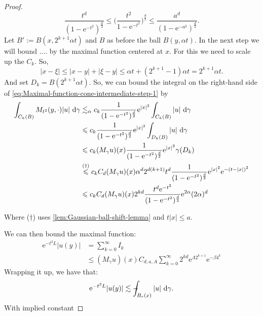 \documentclass[a4paper,oneside,10pt]{amsproc}
\theoremstyle{remark}
\newcommand{\D}{\,\textup{d}}
\def\Xint#1{\mathchoice
  {\XXint\displaystyle\textstyle{#1}}%
  {\XXint\textstyle\scriptstyle{#1}}%
  {\XXint\scriptstyle\scriptscriptstyle{#1}}%
  {\XXint\scriptscriptstyle\scriptscriptstyle{#1}}%
  \!\int}
\def\XXint#1#2#3{{\setbox0=\hbox{$#1{#2#3}{\int}$ }
    \vcenter{\hbox{$#2#3$ }}\kern-.535\wd0}}
\def\dashint{\Xint-}
\renewcommand{\leq}{\leqslant}
\renewcommand{\leq}{\leqslant}
\newcommand{\e}{\mathrm{e}} %
\renewcommand{\leq}{\leqslant}%
\begin{document}
\begin{proof}
  \begin{equation*}
    \frac{t^d}{(1 - \e^{-t^2})^{\frac{d}2}} \leq \biggl(\frac{t^2}{1 -
      \e^{-t^2}} \biggr)^{\frac{d}2} \leq \frac{a^d}{(1 -
      \e^{-a^2})^{\frac{d}2}}.
  \end{equation*}
  Let $B' := B(x, 2^{k + 1} \alpha t)$ and $B$ as before the ball $B(y,
  \alpha t)$. In the next step we will bound ....
  by the maximal function centered at $x$. For this we need to scale
  up the $C_k$. So,
  \begin{equation*}
    |x - \xi| \leq |x - y| + |\xi - y| \leq \alpha t + (2^{k + 1} - 1)
    \alpha t = 2^{k + 1} \alpha t.
  \end{equation*}
  And set $D_k = B(2^{k + 1} \alpha t)$.
  So, we can bound the integral on the right-hand side of
  \eqref{eq:Maximal-function-cone-intermediate-step-1} by
  \begin{align*}
    \int_{C_k(B)}  M_{t^2}(y, \cdot) |u| \,\D\gamma & \lesssim_\alpha
    c_k \frac1{(1 - \e^{-t^2})^{\frac{d}2}}  \e^{|x|^2} \int_{C_k(B)}
    |u| \,\D\gamma\\ 
    &\leq c_k \frac1{(1 -
      \e^{-t^2})^{\frac{d}2}}  \e^{|x|^2} \int_{D_k(B)} |u| \,\D\gamma\\ 
    &\leq c_k (M_\gamma u)(x) \frac1{(1 -  \e^{-t^2})^{\frac{d}2}}  \e^{|x|^2} \gamma(D_k)\\
    &\overset{(\dagger)}{\leq} c_k C_d (M_\gamma u)(x) \alpha^d 2^{d(k + 1)} t^d
    \frac1{(1 - \e^{-t^2})^{\frac{d}2}}  \e^{|x|^2} \e^{-(t -
      |x|)^2}\\
    &\leq c_k C_d (M_\gamma u)(x)  2^{k d} \frac{t^d \e^{-t^2}}{(1 -
      \e^{-t^2})^{\frac{d}2}} \e^{2\alpha} (2\alpha)^d 
  \end{align*}


  Where ($\dagger$) uses \autoref{lem:Gaussian-ball-shift-lemma}
  and $t |x| \leq a$.

  We can then bound the maximal function:
  \begin{align*}
    \e^{-t^2 L} |u(y)| &= \sum_{k = 0}^\infty I_k\\
    &\leq (M_\gamma u)(x) C_{d, a, A} \sum_{k = 0}^\infty 2^{kd} \e^{\Lambda 2^{k + 1}} \e^{-\beta 4^k}
  \end{align*}
  Wrapping it up, we have that:
  \begin{equation*}
    \e^{-t^2 L} |u(y)| \lesssim \dashint_{B_r(x)} |u| \, \D\gamma.
  \end{equation*}
  With implied constant


\end{proof}
\end{document}
